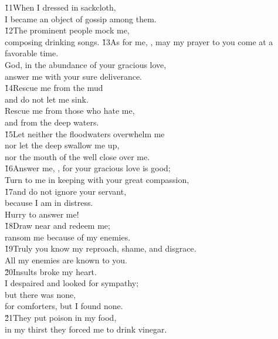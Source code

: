 \begin{poetry}
\poeml \v{11}When I dressed in sackcloth, \\
\poemll    I became an object of gossip among them. \\
\poeml \v{12}The prominent people mock me, \\
\poemll    composing drinking songs.
\poeml \v{13}As for me, , may my prayer to you come at a favorable time. \\
\poemll    God, in the abundance of your gracious love, \\
\poemlll       answer me with your sure deliverance. \\
\poeml \v{14}Rescue me from the mud \\
\poemll    and do not let me sink. \\
\poeml Rescue me from those who hate me, \\
\poemll    and from the deep waters. \\
\poeml \v{15}Let neither the floodwaters overwhelm me \\
\poemll    nor let the deep swallow me up, \\
\poemlll       nor the mouth of the well close over me. \\
\poeml \v{16}Answer me, , for your gracious love is good; \\
\poemll    Turn to me in keeping with your great compassion, \\
\poeml \v{17}and do not ignore your servant, \\
\poemll    because I am in distress. \\
\poemlll       Hurry to answer me! \\
\poeml \v{18}Draw near and redeem me; \\
\poemll    ransom me because of my enemies. \\
\poeml \v{19}Truly you know my reproach, shame, and disgrace. \\
\poemll    All my enemies are known to you. \\
\poeml \v{20}Insults broke my heart. \\
\poemll    I despaired and looked for sympathy; \\
\poeml but there was none, \\
\poemll    for comforters, but I found none. \\
\poeml \v{21}They put poison in my food, \\
\poemll    in my thirst they forced me to drink vinegar. \\

\end{poetry}
